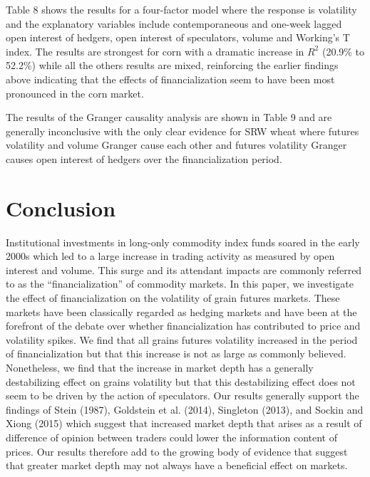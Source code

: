 \documentclass[]{elsarticle} %
\begin{document}
Table 8 shows the results for a four-factor model where the response is
volatility and the explanatory variables include contemporaneous and
one-week lagged open interest of hedgers, open interest of speculators,
volume and Working's T index. The results are strongest for corn with a
dramatic increase in \(R^{2}\) (20.9\% to 52.2\%) while all the others
results are mixed, reinforcing the earlier findings above indicating
that the effects of financialization seem to have been most pronounced
in the corn market.

The results of the Granger causality analysis are shown in Table 9 and
are generally inconclusive with the only clear evidence for SRW wheat
where futures volatility and volume Granger cause each other and futures
volatility Granger causes open interest of hedgers over the
financialization period.

\newpage

\hypertarget{conclusions}{%
\section{Conclusion}\label{conclusions}}

Institutional investments in long-only commodity index funds soared in
the early 2000s which led to a large increase in trading activity as
measured by open interest and volume. This surge and its attendant
impacts are commonly referred to as the ``financialization'' of
commodity markets. In this paper, we investigate the effect of
financialization on the volatility of grain futures markets. These
markets have been classically regarded as hedging markets and have been
at the forefront of the debate over whether financialization has
contributed to price and volatility spikes. We find that all grains
futures volatility increased in the period of financialization but that
this increase is not as large as commonly believed. Nonetheless, we find
that the increase in market depth has a generally destabilizing effect
on grains volatility but that this destabilizing effect does not seem to
be driven by the action of speculators. Our results generally support
the findings of Stein (1987), Goldstein et al. (2014), Singleton (2013),
and Sockin and Xiong (2015) which suggest that increased market depth
that arises as a result of difference of opinion between traders could
lower the information content of prices. Our results therefore add to
the growing body of evidence that suggest that greater market depth may
not always have a beneficial effect on markets.
\end{document}
